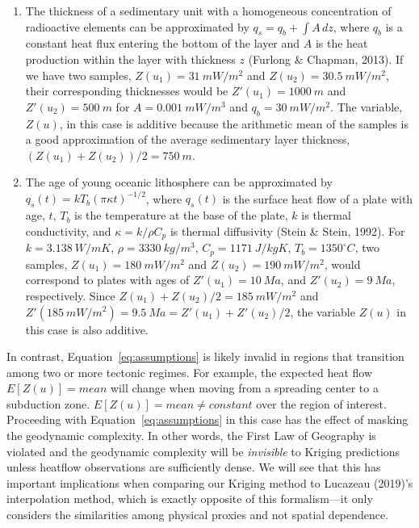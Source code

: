 \documentclass[draft,linenumbers]{agujournal2018}
\begin{document}
\begin{enumerate}
\def\labelenumi{\arabic{enumi}.}
\item
  The thickness of a sedimentary unit with a homogeneous concentration
  of radioactive elements can be approximated by
  \(q_s = q_b + \int A \,dz\), where \(q_b\) is a constant heat flux
  entering the bottom of the layer and \(A\) is the heat production
  within the layer with thickness \(z\) (Furlong \& Chapman, 2013). If
  we have two samples, \(Z(u_1) = 31~mW/m^2\) and
  \(Z(u_2) = 30.5~mW/m^2\), their corresponding thicknesses would be
  \(Z'(u_1) = 1000~m\) and \(Z'(u_2) = 500~m\) for \(A = 0.001~mW/m^3\)
  and \(q_b = 30~mW/m^2\). The variable, \(Z(u)\), in this case is
  additive because the arithmetic mean of the samples is a good
  approximation of the average sedimentary layer thickness,
  \((Z(u_1) + Z(u_2)) / 2 = 750~m\).
\item
  The age of young oceanic lithosphere can be approximated by
  \(q_s(t) = kT_b(\pi\kappa t)^{-1/2}\), where \(q_s(t)\) is the surface
  heat flow of a plate with age, \(t\), \(T_b\) is the temperature at
  the base of the plate, \(k\) is thermal conductivity, and
  \(\kappa = k/\rho C_p\) is thermal diffusivity (Stein \& Stein, 1992).
  For \(k = 3.138~W/mK\), \(\rho = 3330~kg/m^3\), \(C_p = 1171~J/kgK\),
  \(T_b = 1350^{\circ}C\), two samples, \(Z(u_1) = 180~mW/m^2\) and
  \(Z(u_2) = 190~mW/m^2\), would correspond to plates with ages of
  \(Z'(u_1) = 10~Ma\), and \(Z'(u_2) = 9~Ma\), respectively. Since
  \(Z(u_1) + Z(u_2) / 2 = 185~mW/m^2\) and
  \(Z'(185~mW/m^2) = 9.5~Ma = Z'(u_1) + Z'(u_2) / 2\), the variable
  \(Z(u)\) in this case is also additive.
\end{enumerate}

In contrast, Equation~\ref{eq:assumptions} is likely invalid in regions
that transition among two or more tectonic regimes. For example, the
expected heat flow \(E[Z(u)] = mean\) will change when moving from a
spreading center to a subduction zone. \(E[Z(u)] = mean \neq constant\)
over the region of interest. Proceeding with
Equation~\ref{eq:assumptions} in this case has the effect of masking the
geodynamic complexity. In other words, the First Law of Geography is
violated and the geodynamic complexity will be \emph{invisible} to
Kriging predictions unless heatflow observations are sufficiently dense.
We will see that this has important implications when comparing our
Kriging method to Lucazeau (2019)'s interpolation method, which is
exactly opposite of this formalism---it only considers the similarities
among physical proxies and not spatial dependence.
\end{document}
